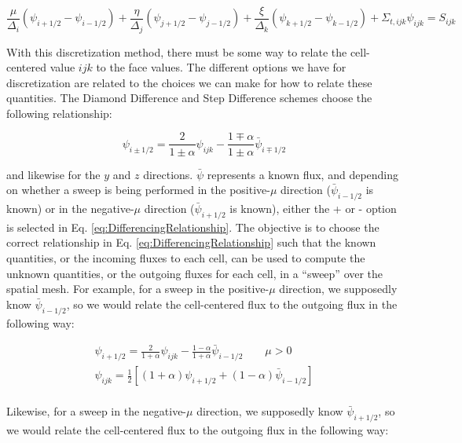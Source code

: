 \documentclass[10pt]{article}
\begin{document}
\begin{flushleft}
\begin{equation}
\label{eq:DiscretizedCartesianTE}
\frac{\mu}{\Delta_i}(\psi_{i+1/2}-\psi_{i-1/2})+\frac{\eta}{\Delta_j}(\psi_{j+1/2}-\psi_{j-1/2})+\frac{\xi}{\Delta_k}(\psi_{k+1/2}-\psi_{k-1/2})+\Sigma_{t,ijk}\psi_{ijk}=S_{ijk}
\end{equation}

With this discretization method, there must be some way to relate the cell-centered value \(ijk\) to the face values. The different options we have for discretization are related to the choices we can make for how to relate these quantities. The Diamond Difference and Step Difference schemes choose the following relationship:

\begin{equation}
\label{eq:DifferencingRelationship}
\psi_{i\pm1/2}=\frac{2}{1\pm\alpha}\psi_{ijk}-\frac{1\mp\alpha}{1\pm\alpha}\bar{\psi}_{i\mp1/2}
\end{equation}

and likewise for the \(y\) and \(z\) directions. \(\bar{\psi}\) represents a known flux, and depending on whether a sweep is being performed in the positive-\(\mu\) direction (\(\bar{\psi}_{i-1/2}\) is known) or in the negative-\(\mu\) direction (\(\bar{\psi}_{i+1/2}\) is known), either the + or - option is selected in Eq. \eqref{eq:DifferencingRelationship}. The objective is to choose the correct relationship in Eq. \eqref{eq:DifferencingRelationship} such that the known quantities, or the incoming fluxes to each cell, can be used to compute the unknown quantities, or the outgoing fluxes for each cell, in a ``sweep'' over the spatial mesh. For example, for a sweep in the positive-\(\mu\) direction, we supposedly know \(\bar{\psi}_{i-1/2}\), so we would relate the cell-centered flux to the outgoing flux in the following way:

\begin{equation}
\begin{aligned}
\psi_{i+1/2}=\frac{2}{1+\alpha}\psi_{ijk}-\frac{1-\alpha}{1+\alpha}\bar{\psi}_{i-1/2}\quad\quad\mu >0\\
\psi_{ijk}=\frac{1}{2}\left\lbrack(1+\alpha)\psi_{i+1/2}+(1-\alpha)\bar{\psi}_{i-1/2}\right\rbrack\\
\end{aligned}
\end{equation}

Likewise, for a sweep in the negative-\(\mu\) direction, we supposedly know \(\bar{\psi}_{i+1/2}\), so we would relate the cell-centered flux to the outgoing flux in the following way:


\end{flushleft}
\end{document}
